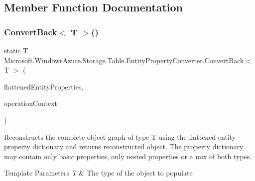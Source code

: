 \subsection{Member Function Documentation}
\mbox{\label{classMicrosoft_1_1WindowsAzure_1_1Storage_1_1Table_1_1EntityPropertyConverter_afb4edd95dfd79d576091119b5ac13ad7_afb4edd95dfd79d576091119b5ac13ad7}} 
\subsubsection{\texorpdfstring{Convert\+Back$<$ T $>$()}{ConvertBack< T >()}\hspace{0.1cm}{\footnotesize\ttfamily [1/2]}}
{\footnotesize\ttfamily static T Microsoft.\+Windows\+Azure.\+Storage.\+Table.\+Entity\+Property\+Converter.\+Convert\+Back$<$ T $>$ (\begin{DoxyParamCaption}\item[{I\+Dictionary$<$ string, Entity\+Property $>$}]{flattened\+Entity\+Properties,  }\item[{Operation\+Context}]{operation\+Context }\end{DoxyParamCaption})\hspace{0.3cm}{\ttfamily [static]}}



Reconstructs the complete object graph of type T using the flattened entity property dictionary and returns reconstructed object. The property dictionary may contain only basic properties, only nested properties or a mix of both types. 


\begin{DoxyTemplParams}{Template Parameters}
{\em T} & The type of the object to populate\\
\hline
\end{DoxyTemplParams}

